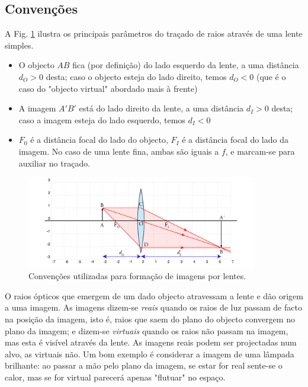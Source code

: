 \documentclass[a4paper,twoside,11pt]{report}      %
\begin{document}
\subsection{\sf Convenções}
A Fig. \ref{fig:convencoes} ilustra os principais parâmetros do traçado de raios através de uma lente simples.

\begin{itemize}
\item O objecto $AB$ fica (por definição) do lado esquerdo da lente, a uma distância $d_O>0$ desta; caso o objecto esteja do lado direito, temos $d_O<0$ (que é o caso do "objecto virtual" abordado mais à frente)
\item A imagem $A'B'$ está do lado direito da lente, a uma distância $d_I>0$ desta; caso a imagem esteja do lado esquerdo, temos $d_I<0$
\item $F_0$ é a distância focal do lado do objecto, $F_I$ é a distância focal do lado da imagem. No caso de uma lente fina, ambas são iguais a $f$, e marcam-se para auxiliar no traçado.
\end{itemize}

\begin{figure}
	[!b]  \centering 
	\includegraphics[width=0.9\textwidth]{3-convencoes}
	\caption{Convenções utilizadas para formação de imagens por lentes. \label{fig:convencoes}} 
\end{figure}

O raios ópticos que emergem de um dado objecto atravessam a lente e dão origem a uma imagem. As imagens dizem-se \emph{reais} quando os raios de luz passam de facto na posição da imagem, isto é, raios que saem do plano do objecto convergem no plano da imagem; e dizem-se \emph{virtuais} quando os raios não passam na imagem, mas esta é visível através da lente. As imagens reais podem ser projectadas num alvo, as virtuais não. Um bom exemplo é considerar a imagem de uma lâmpada brilhante: ao passar a mão pelo plano da imagem, se estar for real sente-se o calor, mas se for virtual parecerá apenas "flutuar" no espaço.
\end{document}
